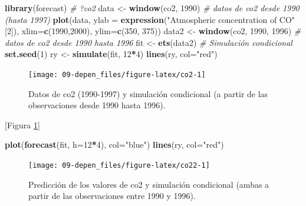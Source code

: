 \documentclass[]{book}
\newenvironment{Shaded}{\begin{snugshade}}{\end{snugshade}}
\newcommand{\KeywordTok}[1]{\textcolor[rgb]{0.13,0.29,0.53}{\textbf{#1}}}
\newcommand{\DataTypeTok}[1]{\textcolor[rgb]{0.13,0.29,0.53}{#1}}
\newcommand{\DecValTok}[1]{\textcolor[rgb]{0.00,0.00,0.81}{#1}}
\newcommand{\StringTok}[1]{\textcolor[rgb]{0.31,0.60,0.02}{#1}}
\newcommand{\CommentTok}[1]{\textcolor[rgb]{0.56,0.35,0.01}{\textit{#1}}}
\newcommand{\OperatorTok}[1]{\textcolor[rgb]{0.81,0.36,0.00}{\textbf{#1}}}
\newcommand{\NormalTok}[1]{#1}
\theoremstyle{definition}
\theoremstyle{definition}
\theoremstyle{definition}
\theoremstyle{remark}
\begin{document}
\begin{Shaded}
\begin{Highlighting}[]
\KeywordTok{library}\NormalTok{(forecast)}
\CommentTok{# ?co2}
\NormalTok{data <-}\StringTok{ }\KeywordTok{window}\NormalTok{(co2, }\DecValTok{1990}\NormalTok{) }\CommentTok{# datos de co2 desde 1990 (hasta 1997)}
\KeywordTok{plot}\NormalTok{(data, }\DataTypeTok{ylab =} \KeywordTok{expression}\NormalTok{(}\StringTok{"Atmospheric concentration of CO"}\NormalTok{[}\DecValTok{2}\NormalTok{]), }
     \DataTypeTok{xlim=}\KeywordTok{c}\NormalTok{(}\DecValTok{1990}\NormalTok{,}\DecValTok{2000}\NormalTok{), }\DataTypeTok{ylim=}\KeywordTok{c}\NormalTok{(}\DecValTok{350}\NormalTok{, }\DecValTok{375}\NormalTok{))}
\NormalTok{data2 <-}\StringTok{ }\KeywordTok{window}\NormalTok{(co2, }\DecValTok{1990}\NormalTok{, }\DecValTok{1996}\NormalTok{) }\CommentTok{# datos de co2 desde 1990 hasta 1996}
\NormalTok{fit <-}\StringTok{ }\KeywordTok{ets}\NormalTok{(data2)}
\CommentTok{# Simulación condicional}
\KeywordTok{set.seed}\NormalTok{(}\DecValTok{1}\NormalTok{)}
\NormalTok{ry <-}\StringTok{ }\KeywordTok{simulate}\NormalTok{(fit, }\DecValTok{12}\OperatorTok{*}\DecValTok{4}\NormalTok{)}
\KeywordTok{lines}\NormalTok{(ry, }\DataTypeTok{col=}\StringTok{"red"}\NormalTok{)}
\end{Highlighting}
\end{Shaded}

\begin{figure}[!htb]

{\centering \texttt{[image: 09-depen\_files/figure-latex/co2-1]} 

}

\caption{Datos de co2 (1990-1997) y simulación condicional (a partir de las observaciones desde 1990 hasta 1996).}\label{fig:co2}
\end{figure}

{[}Figura \ref{fig:co2}{]}

\begin{Shaded}
\begin{Highlighting}[]
\KeywordTok{plot}\NormalTok{(}\KeywordTok{forecast}\NormalTok{(fit, }\DataTypeTok{h=}\DecValTok{12}\OperatorTok{*}\DecValTok{4}\NormalTok{), }\DataTypeTok{col=}\StringTok{"blue"}\NormalTok{)}
\KeywordTok{lines}\NormalTok{(ry, }\DataTypeTok{col=}\StringTok{"red"}\NormalTok{)}
\end{Highlighting}
\end{Shaded}

\begin{figure}[!htb]

{\centering \texttt{[image: 09-depen\_files/figure-latex/co22-1]} 

}

\caption{Predicción de los valores de co2 y simulación condicional (ambas a partir de las observaciones entre 1990 y 1996).}\label{fig:co22}
\end{figure}
\end{document}
